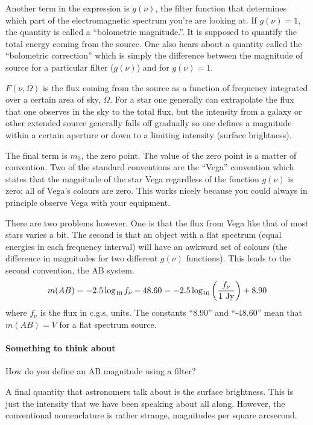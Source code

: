 Another term in the expression is $g(\nu)$, the filter function that
determines which part of the electromagnetic spectrum you're are
looking at.  If $g(\nu)=1$, the quantity is called a ``bolometric
magnitude.''.  It is supposed to quantify the total energy coming from
the source.  One also hears about a quantity called the ``bolometric
correction'' which is simply the
difference between the magnitude of source for a particular filter
($g(\nu)$) and for $g(\nu)=1$.

$F(\nu,\Omega)$ is the flux coming from the source as a function of
frequency integrated over a certain area of sky, $\Omega$.  For a star
one generally can extrapolate the flux that one observes in the sky to
the total flux, but the intensity from a galaxy or other extended
source generally falls off gradually so one defines a magnitude within
a certain aperture or down to a limiting intensity (surface
brightness).   

The final term is $m_0$, the zero point.  The value of the zero point
is a matter of convention.  Two of the standard conventions are the
``Vega'' convention which states that the magnitude of the star Vega
regardless of the function $g(\nu)$ is zero; all of Vega's colours are
zero.  This works nicely because you could always in principle observe
Vega with your equipment.

There are two problems however.  One is that the flux from Vega like
that of most stars varies a bit.  The second is that an object with a
flat spectrum (equal energies in each frequency interval) will have an
awkward set of colours (the difference in magnitudes for two different
$g(\nu)$ functions).  This leads to the second convention, the AB
system.
\begin{equation}
m(AB) = -2.5 \log_{10} f_\nu - 48.60 = -2.5 \log_{10} \left (
\frac{f_\nu}{1~\hbox{\rm Jy}}\right ) + 8.90
\label{eq:12}
\end{equation}
where $f_\nu$ is the flux in c.g.s. units.  The constants ``8.90'' 
and ``-48.60'' mean that $m(AB)=V$ for a flat spectrum source.

\paragraph{Something to think about}
How do you define an AB magnitude using a filter?

A final quantity that astronomers talk about is the surface
brightness.  This is just the intensity that we have been speaking
about all along.  However, the conventional nomenclature is rather strange,
magnitudes per square arcsecond.

